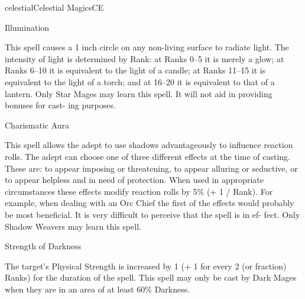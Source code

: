 \begin{College}[1.3]{celestial}{Celestial Magics}{CE}
\begin{spell}[G-9 Star]{Illumination}

\begin{effects}
 This  spell  causes  a  1  inch  circle  on  any 
non-living surface to radiate light. The intensity of 
light  is  determined  by  Rank:  at  Ranks  0–5  it  is 
merely a glow; at Ranks 6–10 it is equivalent to the 
light of a candle; at Ranks 11–15 it is equivalent to 
the light of a torch; and at 16–20 it is equivalent to 
that  of  a  lantern.  Only  Star  Mages  may  learn  this 
spell.  It  will not aid in providing bonuses for cast-
ing purposes. 
\end{effects}
\end{spell}

\begin{spell}[G-9 Shadow]{Charismatic Aura}

\begin{effects}
This spell allows the adept to use shadows 
advantageously  to  influence  reaction  rolls.  The 
adept  can  choose  one  of  three  different  effects  at 
the  time  of  casting.  These  are:  to  appear  imposing 
or threatening, to appear alluring or seductive, or to 
appear  helpless  and  in  need  of  protection.  When 
used  in  appropriate  circumstances  these  effects 
modify  reaction  rolls  by  5\%  (+  1  /  Rank).  For 
example,  when dealing with an Orc Chief the first 
of the effects would probably be most beneficial. It 
is  very  difficult  to  perceive  that  the  spell  is  in  ef-
fect. Only Shadow Weavers may learn this spell. 
\end{effects}
\end{spell}


\begin{spell}[G-9 Dark]{Strength of Darkness}

\begin{effects}
The target’s Physical Strength is increased 
by  1  (+  1  for  every  2  (or  fraction)  Ranks)  for  the 
duration  of  the  spell.  This  spell  may  only  be  cast 
by Dark Mages when they are in an area of at least 
60\% Darkness. 
\end{effects}
\end{spell}



\end{College}
